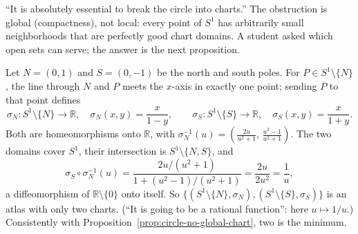 \documentclass[11pt]{report}
\makeatletter
\newcounter{excounter}[section]
\newcommand{\exlabel}[1]{\edef\@currentlabel{\arabic{section}.\arabic{excounter}}\label{#1}}
\newcommand{\leeref}[1]{\par\smallskip{\raggedleft\footnotesize\textsc{Lee}:\ #1\par}}
\makeatother
\begin{document}
\begin{rembox}\label{rem:smooth-structures-4}
``It is absolutely essential to break the circle into charts.'' The obstruction is global (compactness), not local: every point of $S^1$ has arbitrarily small neighborhoods that are perfectly good chart domains. A student asked which open sets can serve; the answer is the next proposition.
\end{rembox}

\begin{exbox}\exlabel{ex:circle-stereo}
Let $N = (0,1)$ and $S = (0,-1)$ be the north and south poles. For $P \in S^1 \setminus \{N\}$, the line through $N$ and $P$ meets the $x$-axis in exactly one point; sending $P$ to that point defines
\[
\sigma_N : S^1 \setminus \{N\} \to \mathbb{R}, \quad \sigma_N(x,y) = \frac{x}{1-y}, \qquad
\sigma_S : S^1 \setminus \{S\} \to \mathbb{R}, \quad \sigma_S(x,y) = \frac{x}{1+y}.
\]
Both are homeomorphisms onto $\mathbb{R}$, with $\sigma_N^{-1}(u) = \left( \frac{2u}{u^2+1},\, \frac{u^2-1}{u^2+1} \right)$. The two domains cover $S^1$, their intersection is $S^1 \setminus \{N, S\}$, and
\[
\sigma_S \circ \sigma_N^{-1}(u) = \frac{2u/(u^2+1)}{1 + (u^2-1)/(u^2+1)} = \frac{2u}{2u^2} = \frac{1}{u},
\]
a diffeomorphism of $\mathbb{R} \setminus \{0\}$ onto itself. So $\{(S^1 \setminus \{N\}, \sigma_N), (S^1 \setminus \{S\}, \sigma_S)\}$ is an atlas with only two charts. (``It is going to be a rational function'': here $u \mapsto 1/u$.) Consistently with Proposition~\ref{prop:circle-no-global-chart}, two is the minimum.
\leeref{Problem 1-7}
\end{exbox}
\end{document}
